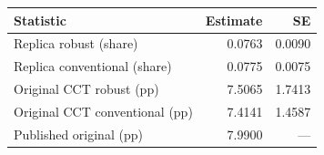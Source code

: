 \begin{tabular}{lrr}
    \toprule
    Statistic & Estimate & SE \\
    \midrule
    Replica robust (share) & 0.0763 & 0.0090 \\
    Replica conventional (share) & 0.0775 & 0.0075 \\
    Original CCT robust (pp) & 7.5065 & 1.7413 \\
    Original CCT conventional (pp) & 7.4141 & 1.4587 \\
    Published original (pp) & 7.9900 & --- \\
    \bottomrule
\end{tabular}
